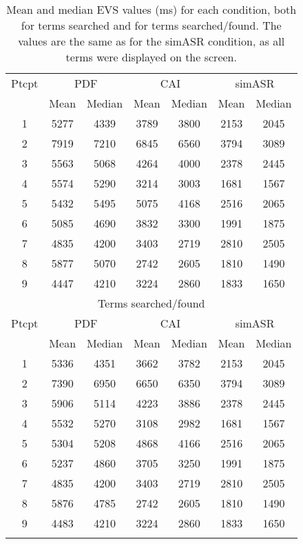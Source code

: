 \begin{table}
\begin{tabular}{ccccccc}
\lsptoprule
\multicolumn{7}{c}{{Terms searched}} \\
\midrule
{Ptcpt} & \multicolumn{2}{c}{PDF} & \multicolumn{2}{c}{CAI} & \multicolumn{2}{c}{simASR}\\\cmidrule(lr){2-3}\cmidrule(lr){4-5}\cmidrule(lr){6-7}
& Mean & Median & Mean & Median & Mean & Median \\
\midrule
1 & 5277 & 4339 & 3789 & 3800 & 2153 & 2045 \\
2 & 7919 & 7210	& 6845 & 6560 & 3794 & 3089 \\
3 & 5563 & 5068 & 4264 & 4000 & 2378 & 2445 \\
4 & 5574 & 5290 & 3214 & 3003 & 1681 & 1567 \\
5 & 5432 & 5495 & 5075 & 4168 & 2516 & 2065 \\
6 & 5085 & 4690 & 3832 & 3300 & 1991 & 1875 \\
7 & 4835 & 4200 & 3403 & 2719 & 2810 & 2505 \\
8 & 5877 & 5070 & 2742 & 2605 & 1810 & 1490 \\
9 & 4447 & 4210 & 3224 & 2860 & 1833 & 1650 \\
\midrule
\multicolumn{7}{c}{{Terms searched/found}}\\
\midrule
{Ptcpt} & \multicolumn{2}{c}{PDF} & \multicolumn{2}{c}{CAI} & \multicolumn{2}{c}{simASR}\\\cmidrule(lr){2-3}\cmidrule(lr){4-5}\cmidrule(lr){6-7}
& Mean & Median & Mean & Median & Mean & Median \\
\midrule
1 & 5336 & 4351 & 3662 & 3782 & 2153 & 2045 \\
2 & 7390 & 6950 & 6650 & 6350 & 3794 & 3089 \\
3 & 5906 & 5114 & 4223 & 3886 & 2378 & 2445 \\
4 & 5532 & 5270 & 3108 & 2982 & 1681 & 1567 \\
5 & 5304 & 5208 & 4868 & 4166 & 2516 & 2065 \\
6 & 5237 & 4860 & 3705 & 3250 & 1991 & 1875 \\
7 & 4835 & 4200 & 3403 & 2719 & 2810 & 2505 \\
8 & 5876 & 4785 & 2742 & 2605 & 1810 & 1490 \\
9 & 4483 & 4210 & 3224 & 2860 & 1833 & 1650 \\
\lspbottomrule
    \end{tabular}
\caption{Mean and median EVS values (ms) for each condition, both for terms searched and for terms searched/found. The values are the same as for the simASR condition, as all terms were displayed on the screen.\label{tab:EVS}}
\end{table}

